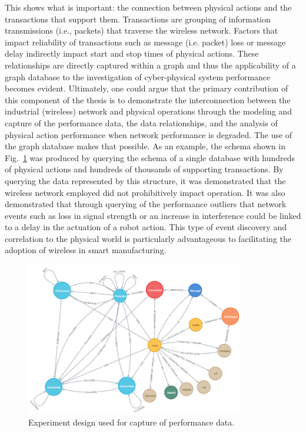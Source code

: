 This shows what is important: the connection between physical actions and the transactions that support them.  Transactions are grouping of information transmissions (i.e., packets) that traverse the wireless network.  Factors that impact reliability of transactions such as message (i.e. packet) loss or message delay indirectly impact start and stop times of physical actions.  These relationships are directly captured within a graph and thus the applicability of a graph database to the investigation of cyber-physical system performance becomes evident.  Ultimately, one could argue that the primary contribution of this component of the thesis is to demonstrate the interconnection between the industrial (wireless) network and physical operations through the modeling and capture of the performance data, the data relationships, and the analysis of physical action performance when network performance is degraded.  The use of the graph database makes that possible.  As an example, the schema shown in Fig.~\ref{fig:concl:data-physical-actions-following} was produced by querying the schema of a single database with hundreds of physical actions and hundreds of thousands of supporting transactions.  By querying the data represented by this structure, it was demonstrated that the wireless network employed did not prohibitively impact operation.  It was also demonstrated that through querying of the performance outliers that network events such as loss in signal strength or an increase in interference could be linked to a delay in the actuation of a robot action.  This type of event discovery and correlation to the physical world is particularly advantageous to facilitating the adoption of wireless in smart manufacturing.

\begin{figure}[!ht]
	\centering
	\includegraphics[width=0.85\textwidth]{chapter-gdb-appl/figures/database/graph_schema_updated_2.png}
	\caption{Experiment design used for capture of performance data.}
	\label{fig:concl:data-physical-actions-following}
\end{figure}

